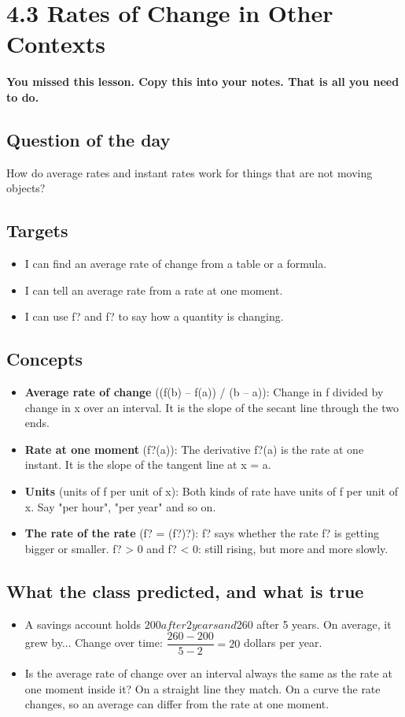 \documentclass[11pt]{article}
\begin{document}
\section*{4.3 Rates of Change in Other Contexts}
\textbf{You missed this lesson. Copy this into your notes. That is all you need to do.}\par\medskip
\subsection*{Question of the day}
How do average rates and instant rates work for things that are not moving objects?\par
\subsection*{Targets}\begin{itemize}\item I can find an average rate of change from a table or a formula.
\item I can tell an average rate from a rate at one moment.
\item I can use f? and f? to say how a quantity is changing.\end{itemize}
\subsection*{Concepts}\begin{itemize}
\item \textbf{Average rate of change} ((f(b) -- f(a)) / (b -- a)): Change in f divided by change in x over an interval. It is the slope of the secant line through the two ends.
\item \textbf{Rate at one moment} (f?(a)): The derivative f?(a) is the rate at one instant. It is the slope of the tangent line at x = a.
\item \textbf{Units} (units of f per unit of x): Both kinds of rate have units of f per unit of x. Say "per hour", "per year" and so on.
\item \textbf{The rate of the rate} (f? = (f?)?): f? says whether the rate f? is getting bigger or smaller. f? > 0 and f? < 0: still rising, but more and more slowly.
\end{itemize}
\subsection*{What the class predicted, and what is true}\begin{itemize}
\item A savings account holds $200 after 2 years and $260 after 5 years. On average, it grew by...  Change over time: $\dfrac{260-200}{5-2}=20$ dollars per year.
\item Is the average rate of change over an interval always the same as the rate at one moment inside it?  On a straight line they match. On a curve the rate changes, so an average can differ from the rate at one moment.
\end{itemize}
\end{document}
